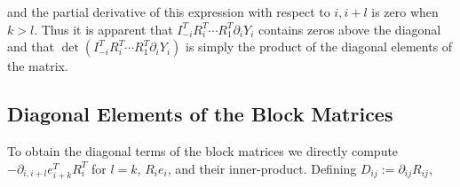 \documentclass[ba]{imsart}
\numberwithin{equation}{section}
\theoremstyle{plain}
\begin{document}
\noindent and the partial derivative of this expression with respect to $i,i+l$ is zero when $k > l$. Thus it is apparent that $I_{-i}^T R_i^T \cdots R_1^T \partial_{i} Y_i $ contains zeros above the diagonal and that $\det \left( I_{-i}^T R_i^T \cdots R_1^T \partial_{i} Y_i \right)$ is simply the product of the diagonal elements of the matrix.

\subsection{Diagonal Elements of the Block Matrices}
To obtain the diagonal terms of the block matrices we directly compute $-\partial_{i,i+l} e_{i+k}^T R_i^T$ for $l=k$, $R_i e_i$, and their inner-product. Defining $D_{ij} := \partial_{ij} R_{ij}$,
\end{document}
